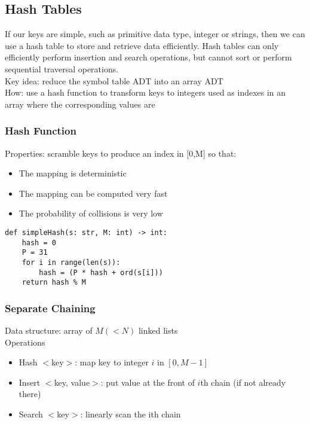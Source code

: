 \documentclass[a4paper]{article}
\begin{document}
\subsection{Hash Tables}
If our keys are simple, such as primitive data type, integer or strings, then we can use a hash table to store and retrieve data efficiently. Hash tables can only efficiently perform insertion and search operations, but cannot sort or perform sequential traversal operations.\\
\newline
Key idea: reduce the symbol table ADT into an array ADT\\
How: use a hash function to transform keys to integers used as indexes in an array where the corresponding values are

\subsubsection*{Hash Function}
Properties: scramble keys to produce an index in [0,M] so that:
\begin{itemize}
    \item The mapping is deterministic
    \item The mapping can be computed very fast
    \item The probability of collisions is very low
\end{itemize}
\begin{center}
\end{center}
\begin{lstlisting}
def simpleHash(s: str, M: int) -> int:
    hash = 0
    P = 31
    for i in range(len(s)):
        hash = (P * hash + ord(s[i]))
    return hash % M
\end{lstlisting}

\subsubsection*{Separate Chaining}
Data structure: array of $M(<N)$ linked lists\\
Operations
\begin{itemize}
    \item Hash $<$key$>$: map key to integer $i$ in $[0, M-1]$
    \item Insert $<$key, value$>$: put value at the front of $i$th chain (if not already there)
    \item Search $<$key$>$: linearly scan the ith chain
\end{itemize}
\end{document}
